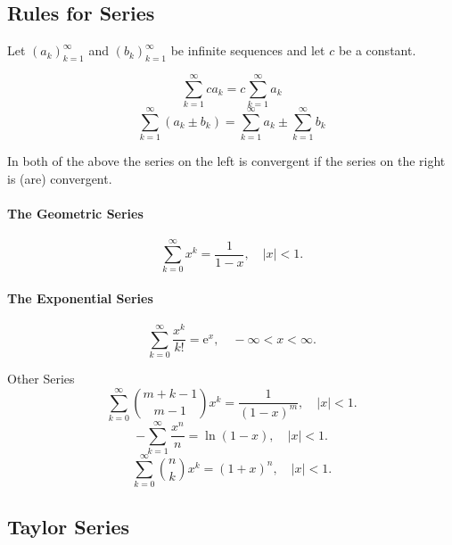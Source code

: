 \documentclass[captions=tableheading]{scrbook}
\begin{document}
\subsection{Rules for Series}
\label{sec-21-3-3}


Let \(\left(a_{k}\right)_{k=1}^{\infty}\) and \(\left(b_{k}\right)_{k=1}^{\infty}\) be infinite sequences and let \(c\) be a constant.

\begin{equation}
\sum_{k=1}^{\infty}ca_{k}=c\sum_{k=1}^{\infty}a_{k}
\end{equation}
\begin{equation}
\sum_{k=1}^{\infty}(a_{k}\pm b_{k})=\sum_{k=1}^{\infty}a_{k}\pm\sum_{k=1}^{\infty}b_{k}
\end{equation}

In both of the above the series on the left is convergent if the series on the right is (are) convergent.

\paragraph*{The Geometric Series}
\begin{equation}
\sum_{k=0}^{\infty} x^{k} = \frac{1}{1 - x},\quad|x| < 1.\label{eq:geom-series}
\end{equation}

\paragraph*{The Exponential Series}
\begin{equation}
\sum_{k=0}^{\infty}\frac{x^{k}}{k!} = \mathrm{e}^{x},\quad -\infty < x < \infty. \label{eq:exp-series}
\end{equation}

Other Series
\begin{equation}
\sum_{k=0}^{\infty}{m+k-1 \choose m-1}x^{k}=\frac{1}{(1-x)^{m}},\quad|x|<1.\label{eq:negbin-series}
\end{equation}
\begin{equation}
-\sum_{k=1}^{\infty}\frac{x^{n}}{n}=\ln(1-x),\quad|x|<1.\label{eq:log-series}
\end{equation}
\begin{equation}
\sum_{k=0}^{\infty}{n \choose k}x^{k}=(1+x)^{n},\quad|x|<1.\label{eq:binom-series-infinite}
\end{equation}
\subsection{Taylor Series}
\label{sec-21-3-4}
\end{document}
